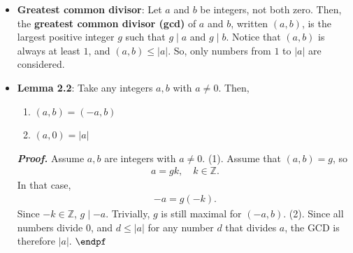 \documentclass{report}
\begin{document}
\begin{itemize}
\begin{align*}
            .\end{align*}
            Notice that $a=0$ would imply that $b = 0$, but $ b \ne 0$. So, $a \ne 0$. Then,
            \begin{align*}
               -1 < \frac{b}{a} = r < 1 
           .\end{align*}
           But, this would contradict the fact that $r \in \mathbb{Z}$. So, $a \leq \left\lvert b \right\rvert $.
           \bigbreak \noindent 
           (3). Suppose that $a \mid b$ and $a \mid c$, so
           \begin{align*}
               b = ar,\; c = ak, \quad r,k \in \mathbb{Z}
           .\end{align*}
           Let $u,v \in \mathbb{Z}$, 
           \begin{align*}
               bu = aru,\; cv = akv
           .\end{align*}
           Then,
           \begin{align*}
               bu + cv = aru + akv = a(ru + kv)
           .\end{align*}
           Since $ru + kv \in \mathbb{Z}$, $a \mid bu + cv$ for all $u,v \in \mathbb{Z}$. $\endpf$.

        \item \textbf{Greatest common divisor}: Let $a$ and $b$ be integers, not both zero. Then, the \textbf{greatest common divisor (gcd)} of $a$ and $b$, written $(a,b)$, is the largest positive integer $g$ such that $g \mid a$ and $g \mid b$.
            \bigbreak \noindent 
            Notice that $(a,b)$ is always at least $1$, and $(a,b) \leq \left\lvert a \right\rvert $. So, only numbers from $1$ to $\left\lvert a \right\rvert $ are considered.
        \item \textbf{Lemma 2.2}: Take any integers $a,b$ with $a\ne 0$. Then,
            \begin{enumerate}
                \item $(a,b) = (-a,b)$
                \item $(a,0) = \left\lvert a \right\rvert $
            \end{enumerate}
            \bigbreak \noindent 
            \textbf{\textit{Proof.}} Assume $a,b$ are integers with $a\ne 0$. 
            \bigbreak \noindent 
            (1). Assume that $(a,b) = g$, so
            \begin{align*}
               a = gk, \quad k \in \mathbb{Z} 
            .\end{align*}
            In that case, 
            \begin{align*}
                -a = g(-k)
            .\end{align*}
            Since $-k \in \mathbb{Z}$, $g \mid -a$. Trivially, $g$ is still maximal for $(-a,b)$.
            \bigbreak \noindent 
            (2). Since all numbers divide $0$, and $d \leq \left\lvert a \right\rvert $ for any number $d$ that divides $a$, the GCD is therefore $\left\lvert a \right\rvert $. $\endpf$


\end{itemize}
\end{document}
